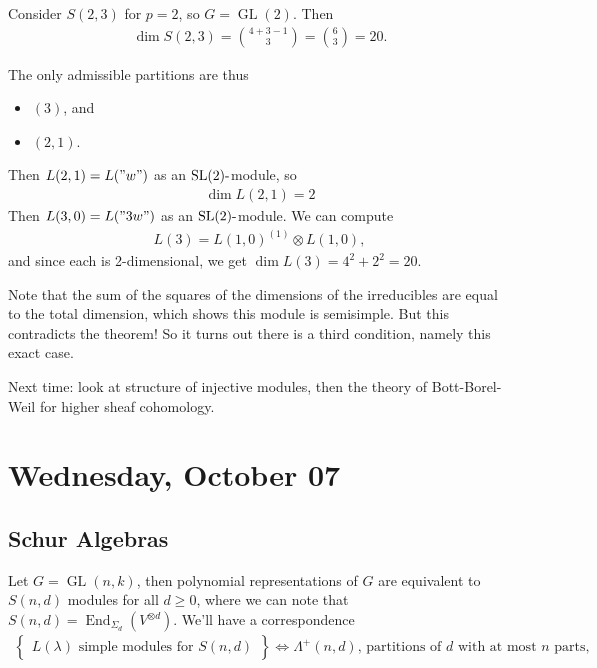 \begin{example}

\begin{example}

Consider \(S(2, 3)\) for \(p=2\), so \(G = \operatorname{GL}(2)\). Then
\begin{align*}   \dim S(2, 3) = {4+3-1 \choose 3} = {6\choose 3} = 20 .\end{align*}

The only admissible partitions are thus

\begin{itemize}
\tightlist
\item
  \((3)\), and
\item
  \((2, 1)\).
\end{itemize}

Then \(L(2, 1) = L("w")\) as an \({\text{SL}}(2){\hbox{-}}\)module, so
\begin{align*} \dim L(2, 1) = 2 \end{align*} Then \(L(3, 0) = L("3w")\)
as an \({\text{SL}}(2){\hbox{-}}\)module. We can compute
\begin{align*}   L(3) = L(1, 0)^{(1)} \otimes L(1, 0) ,\end{align*} and
since each is 2-dimensional, we get \(\dim L(3) = 4^2 + 2^2 = 20\).

Note that the sum of the squares of the dimensions of the irreducibles
are equal to the total dimension, which shows this module is semisimple.
But this contradicts the theorem! So it turns out there is a third
condition, namely this exact case.

\end{example}

\end{example}

Next time: look at structure of injective modules, then the theory of
Bott-Borel-Weil for higher sheaf cohomology.

\hypertarget{wednesday-october-07}{%
\section{Wednesday, October 07}\label{wednesday-october-07}}

\hypertarget{schur-algebras}{%
\subsection{Schur Algebras}\label{schur-algebras}}

Let \(G = \operatorname{GL}(n, k)\), then polynomial representations of
\(G\) are equivalent to \(S(n, d)\) modules for all \(d\geq 0\), where
we can note that
\(S(n, d) = \operatorname{End}_{\Sigma_d}(V^{\otimes d})\). We'll have a
correspondence
\begin{align*}   \left\{{\substack{L(\lambda) \text{ simple modules for } S(n,d)}}\right\} \iff \Lambda^+(n, d) \text{, partitions of $d$ with at most $n$ parts} ,\end{align*}

